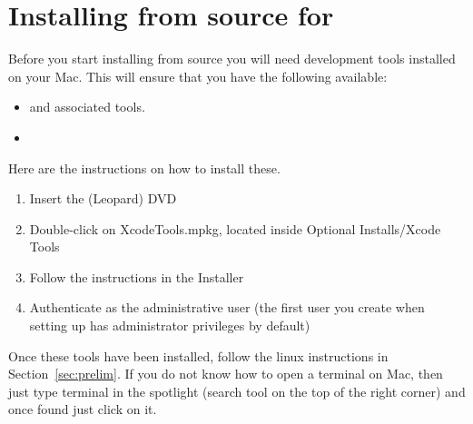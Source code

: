 %
%
%

\section{Installing from source for \macosx}
\label{sec:srcmac}

Before you start installing from source you will need \macosx development tools installed on your Mac.
This will ensure that you have the following available:
\begin{itemize}
\item {} and associated tools.
\item {}
\end{itemize}

Here are the instructions on how to install these.
\begin{enumerate}
\item Insert the  (Leopard) DVD
\item Double-click on XcodeTools.mpkg, located inside Optional Installs/Xcode Tools
\item Follow the instructions in the Installer
\item Authenticate as the administrative user (the first user you create when setting up \macosx has administrator privileges by default)
\end{enumerate}


Once these tools have been installed, follow the linux instructions in Section~\ref{sec:prelim}.
If you do not know how to open a terminal on Mac, then just type terminal in the spotlight (search tool on the top of the right corner) and once found just click on it.

